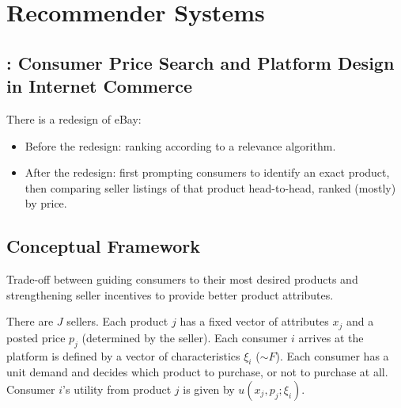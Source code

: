 \chapter{Recommender Systems}
\section{\cite{dinerstein2018consumer}: Consumer Price Search and Platform Design in Internet Commerce}
There is a redesign of eBay:
\begin{itemize}
    \item Before the redesign: ranking according to a relevance algorithm.
    \item After the redesign: first prompting consumers to identify an exact product, then comparing seller listings of that product  head-to-head, ranked (mostly) by price.
\end{itemize}

\section{Conceptual Framework}
Trade-off between guiding consumers to their most desired products and strengthening seller  incentives to provide better product attributes.

There are $J$ sellers. Each product $j$ has a fixed vector of attributes $x_j$ and a posted price $p_j$ (determined by the seller). Each consumer $i$ arrives at the platform is defined by a vector of characteristics $\xi_i$ ($\sim F$). Each consumer has a unit demand and decides which product to purchase, or not to purchase at all. Consumer $i$'s utility from product $j$ is given by $u(x_j,p_j;\xi_i)$.